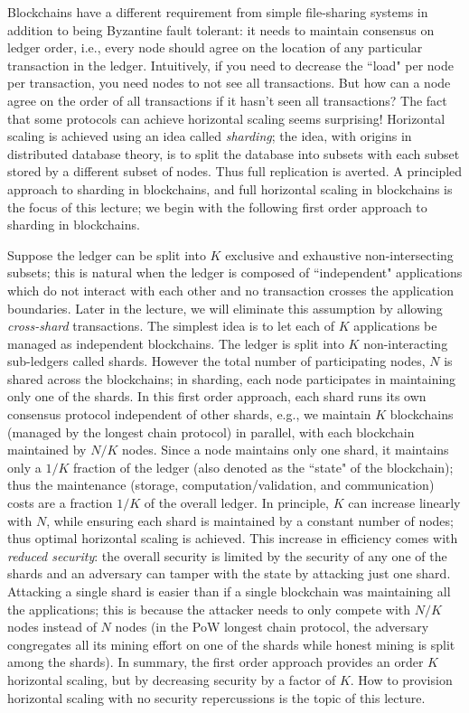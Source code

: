 \documentclass{article}
\begin{document}
Blockchains have a different requirement from simple file-sharing systems in addition to being Byzantine fault tolerant: it needs to maintain consensus on ledger order, i.e.,  every node should agree on the location of any particular transaction in the ledger. 
Intuitively, if you need to decrease the ``load" per node per transaction, you need nodes to not  see all transactions. But how can a node agree on the order of all transactions if it hasn't seen all transactions? The fact that some protocols can achieve horizontal scaling seems surprising!  Horizontal scaling is achieved using an idea called {\em sharding}; the idea, with origins in distributed database theory, is to split the  database  into subsets with  each  subset  stored by a different subset of nodes. Thus full replication is averted. A principled approach to sharding in blockchains, and full horizontal scaling in blockchains is the focus of this lecture; we begin with the following first order approach to sharding in blockchains. 



Suppose the ledger can be split into $K$ exclusive and exhaustive non-intersecting subsets; this is natural when the ledger is composed of ``independent" applications which do not interact with each other and no transaction crosses the application boundaries. Later in the lecture, we will eliminate this assumption by allowing {\em   cross-shard} transactions. 
The simplest idea is to let each of  $K$ applications   be managed as independent blockchains. The ledger is split into $K$ non-interacting sub-ledgers called shards. However the total number of participating nodes, $N$ is shared across the blockchains; in sharding, each node participates in maintaining only one of the shards. In this first order approach, each shard runs its own consensus protocol independent of other shards, e.g., we maintain  $K$ blockchains (managed by the longest chain protocol) in parallel, with each blockchain  maintained by $N/K$ nodes. Since a node maintains only one shard, it maintains only a $1/K$ fraction of the ledger (also denoted as the ``state" of the blockchain); thus the maintenance (storage, computation/validation, and communication) costs are a fraction  $1/K$  of the overall ledger. In principle, $K$ can increase linearly with $N$, while ensuring each shard is maintained by a constant number of nodes; thus optimal horizontal scaling is achieved.  This increase in efficiency comes with  {\em reduced security}: the overall security is limited by the security of any one of the shards and  an adversary can tamper with the state by attacking just one shard. Attacking a single shard is easier than if a single   blockchain was maintaining all the applications; this is because  the attacker needs to only compete with $N/K$ nodes instead of $N$ nodes (in the PoW longest chain protocol, the adversary congregates all its mining effort on one of the shards while honest mining is split among the shards).  In summary, the first order approach provides an order $K$ horizontal scaling, but by decreasing security by a factor of $K$. How to provision horizontal scaling with no security repercussions is the topic of this lecture. 
\end{document}
